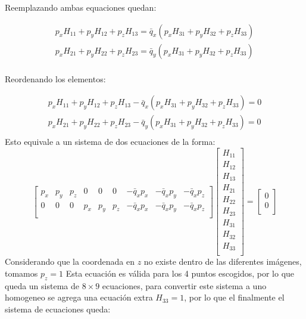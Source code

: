 \documentclass[conference]{IEEEtran}
\begin{document}
Reemplazando ambas equaciones quedan:

\begin{equation*}
    \begin{array}{c}
    
    p_x H_{11} + p_y H_{12} + p_z H_{13} = \bar{q}_x(p_x H_{31} + p_y H_{32} + p_z H_{33}) \\
    
    p_x H_{21} + p_y H_{22} + p_z H_{23} = \bar{q}_y(p_x H_{31} + p_y H_{32} + p_z H_{33})  \\
    
    \end{array}    
\end{equation*}

Reordenando los elementos:

\begin{equation*}
    \begin{array}{c}
    
    p_x H_{11} + p_y H_{12} + p_z H_{13} - \bar{q}_x(p_x H_{31} + p_y H_{32} + p_z H_{33}) = 0 \\
    
    p_x H_{21} + p_y H_{22} + p_z H_{23} - \bar{q}_y(p_x H_{31} + p_y H_{32} + p_z H_{33}) = 0 \\
    
    \end{array}    
\end{equation*}
	Esto equivale a un sistema de dos ecuaciones de la forma:
	\begin{equation*}
	\begin{bmatrix}
	p_x & p_y & p_z & 0 & 0 & 0& -\bar{q}_x p_x & -\bar{q}_x p_y &-\bar{q}_x p_z \\
      0 & 0 & 0 & p_x & p_y & p_z & -\bar{q}_x p_x & -\bar{q}_x p_y &-\bar{q}_x p_z \\
	\end{bmatrix}
		\begin{bmatrix}
		H_{11} \\
		H_{12} \\
		H_{13} \\
		H_{21} \\
		H_{22} \\
		H_{23} \\
		H_{31} \\
		H_{32} \\
		H_{33} \\
	\end{bmatrix}
	= 
		\begin{bmatrix}
		0 \\
		0 \\
	\end{bmatrix}
	\end{equation*}
	Considerando que la coordenada en $z$ no existe dentro de las diferentes imágenes, tomamos $p_z = 1$
	Esta ecuación es válida para los 4 puntos escogidos, por lo que queda un sistema de $8 \times 9$ ecuaciones, para convertir este sistema a uno homogeneo se agrega una ecuación extra $H_{33} = 1$, por lo que el finalmente el sistema de ecuaciones queda:
\end{document}
